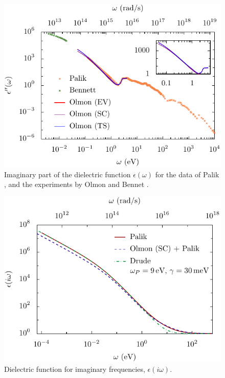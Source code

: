 \documentclass[twocolumn,superscriptaddress,pre]{revtex4-1}
\begin{document}
\begin{figure}
\includegraphics[width=0.95\columnwidth]{img/eps.pdf}
\caption{Imaginary part of the dielectric function $\epsilon(\omega)$ for the
data of Palik \cite{Palik1995}, and the experiments by Olmon \cite{Olmon2012}
and Bennet \cite{Bennett1966}.}
\label{fig:eps}
\end{figure}

\begin{figure}
\includegraphics[width=0.95\columnwidth]{img/eps_imag.pdf}
\caption{Dielectric function for imaginary frequencies, $\epsilon(i\omega)$.}
\label{fig:eps_imag}
\end{figure}
\end{document}
